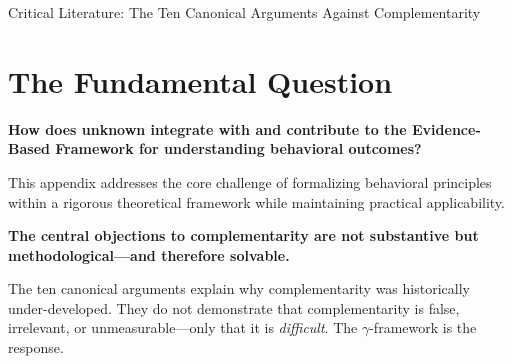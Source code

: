\begin{chapter}{Critical Literature: The Ten Canonical Arguments Against Complementarity}
\section{The Fundamental Question}
\label{sec:crt-fundamental}

\begin{tcolorbox}[
    colback=red!5!white,
    colframe=red!75!black,
    title={\textbf{Fundamental Question}}
]
\textbf{How does unknown integrate with and contribute to the
Evidence-Based Framework for understanding behavioral outcomes?}

This appendix addresses the core challenge of formalizing behavioral principles
within a rigorous theoretical framework while maintaining practical applicability.
\end{tcolorbox}





\begin{tcolorbox}[colback=red!5!white,colframe=red!75!black,title=\textbf{Fundamental Insight}]
\begin{center}
\large
\textbf{The central objections to complementarity are not substantive but methodological---and therefore solvable.}
\end{center}

\vspace{0.5em}
The ten canonical arguments explain why complementarity was historically under-developed. They do not demonstrate that complementarity is false, irrelevant, or unmeasurable---only that it is \textit{difficult}. The $\gamma$-framework is the response.
\end{tcolorbox}


\end{chapter}
